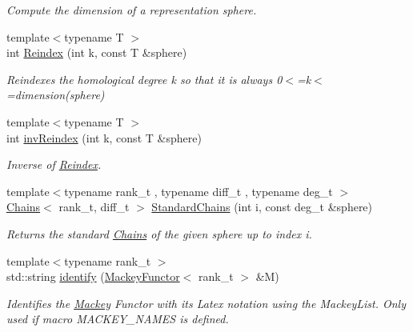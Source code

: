 \begin{DoxyCompactItemize}
\begin{DoxyCompactList}\small\item\em Compute the dimension of a representation sphere. \end{DoxyCompactList}\item 
{\footnotesize template$<$typename T $>$ }\\int \hyperlink{namespaceMackey_acb84c147d9ee39eac2883a762e3710dd}{Reindex} (int k, const T \&sphere)
\begin{DoxyCompactList}\small\item\em Reindexes the homological degree k so that it is always 0$<$=k$<$=dimension(sphere) \end{DoxyCompactList}\item 
{\footnotesize template$<$typename T $>$ }\\int \hyperlink{namespaceMackey_a011b8e23bc2eedf751a9ce7bdc9e4cb9}{inv\+Reindex} (int k, const T \&sphere)
\begin{DoxyCompactList}\small\item\em Inverse of \hyperlink{namespaceMackey_a7da73ade3ee83c4ffd614e79242d7c04}{Reindex}. \end{DoxyCompactList}\item 
{\footnotesize template$<$typename rank\+\_\+t , typename diff\+\_\+t , typename deg\+\_\+t $>$ }\\\hyperlink{classMackey_1_1Chains}{Chains}$<$ rank\+\_\+t, diff\+\_\+t $>$ \hyperlink{namespaceMackey_aac9deeccbe291d1dd17df46a3d7c1f2b}{Standard\+Chains} (int i, const deg\+\_\+t \&sphere)
\begin{DoxyCompactList}\small\item\em Returns the standard \hyperlink{classMackey_1_1Chains}{Chains} of the given sphere up to index i. \end{DoxyCompactList}\item 
{\footnotesize template$<$typename rank\+\_\+t $>$ }\\std\+::string \hyperlink{namespaceMackey_a216f2d9a39510ce4513d5d8a576adc43}{identify} (\hyperlink{classMackey_1_1MackeyFunctor}{Mackey\+Functor}$<$ rank\+\_\+t $>$ \&M)
\begin{DoxyCompactList}\small\item\em Identifies the \hyperlink{namespaceMackey}{Mackey} Functor with its Latex notation using the Mackey\+List. Only used if macro M\+A\+C\+K\+E\+Y\+\_\+\+N\+A\+M\+ES is defined. \end{DoxyCompactList}\end{DoxyCompactItemize}
